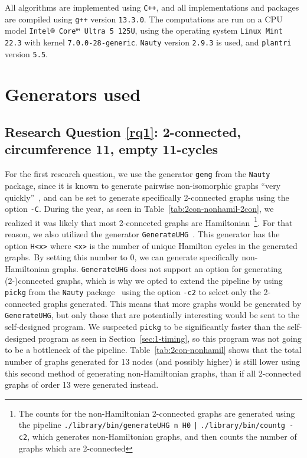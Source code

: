 All algorithms are implemented using \texttt{C++}, and all implementations and packages are compiled using \texttt{g++} version \texttt{13.3.0}. The computations are run on a CPU model \texttt{Intel® Core™ Ultra 5 125U}, using the operating system \texttt{Linux Mint 22.3} with kernel \texttt{7.0.0-28-generic}. \texttt{Nauty} version \texttt{2.9.3} is used, and \texttt{plantri} version \texttt{5.5}.

\section{Generators used}
\label{sec:generators-used}

\subsection{Research Question \ref{rq1}: 2-connected, circumference 11, empty 11-cycles}

For the first research question, we use the generator \texttt{geng} from the \texttt{Nauty} package, since it is known to generate pairwise non-isomorphic graphs ``very quickly''~\cite{lib:nauty}, and can be set to generate specifically 2-connected graphs using the option \texttt{-C}. During the year, as seen in Table~\ref{tab:2con-nonhamil-2con}, we realized it was likely that most 2-connected graphs are Hamiltonian\
\footnote{The counts for the non-Hamiltonian 2-connected graphs are generated using the pipeline \texttt{./library/bin/generateUHG n H0} \texttt{|} \texttt{./library/bin/countg -c2}, which generates non-Ha\-mil\-to\-nian graphs, and then counts the number of graphs which are 2-connected}.
For that reason, we also utilized the generator \texttt{GenerateUHG}~\cite{lib:UHG}. This generator has the option \texttt{H<x>} where \texttt{<x>} is the number of unique Hamilton cycles in the generated graphs. By setting this number to 0, we can generate specifically non-Hamiltonian graphs. \texttt{GenerateUHG} does not support an option for generating (2-)connected graphs, which is why we opted to extend the pipeline by using \texttt{pickg} from the \texttt{Nauty} package~\cite{lib:nauty} using the option \texttt{-c2} to select only the 2-connected graphs generated. This means that more graphs would be generated by \texttt{GenerateUHG}, but only those that are potentially interesting would be sent to the self-designed program. We suspected \texttt{pickg} to be significantly faster than the self-designed program as seen in Section~\ref{sec:1-timing}, so this program was not going to be a bottleneck of the pipeline. Table~\ref{tab:2con-nonhamil} shows that the total number of graphs generated for 13 nodes (and possibly higher) is still lower using this second method of generating non-Hamiltonian graphs, than if all 2-connected graphs of order 13 were generated instead.


